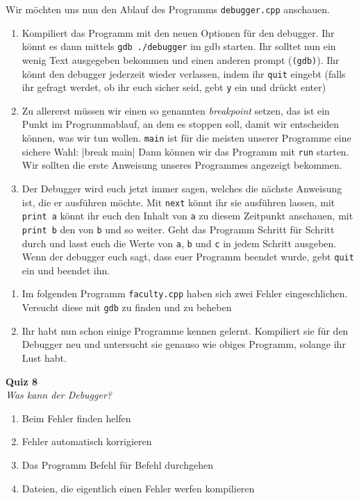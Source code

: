 \newpage

\begin{praxis}

    Wir möchten uns nun den Ablauf des Programms \texttt{debugger.cpp} anschauen.

    \begin{enumerate}
        \item Kompiliert das Programm mit den neuen Optionen für den debugger. Ihr
              könnt es dann mittels \verb|gdb ./debugger| im gdb starten. Ihr solltet
              nun ein wenig Text ausgegeben bekommen und einen anderen prompt
              (\texttt{(gdb)}). Ihr könnt den debugger jederzeit wieder verlassen,
              indem ihr \texttt{quit} eingebt (falls ihr gefragt werdet, ob ihr euch
              sicher seid, gebt \texttt{y} ein und drückt enter)
        \item Zu allererst müssen wir einen so genannten \emph{breakpoint} setzen,
              das ist ein Punkt im Programmablauf, an dem es stoppen soll, damit wir
              entscheiden können, was wir tun wollen. \texttt{main} ist für die
              meisten unserer Programme eine sichere Wahl:
              |break main|
              Dann können wir das Programm mit \texttt{run} starten. Wir sollten die
              erste Anweisung unseres Programmes angezeigt bekommen.
        \item Der Debugger wird euch jetzt immer sagen, welches die nächste
              Anweisung ist, die er ausführen möchte. Mit \texttt{next} könnt ihr sie
              ausführen lassen, mit \texttt{print a} könnt ihr euch den Inhalt von
              \texttt{a} zu diesem Zeitpunkt anschauen, mit \texttt{print b} den von
              \texttt{b} und so weiter. Geht das Programm Schritt für Schritt durch
              und lasst euch die Werte von \texttt{a}, \texttt{b} und \texttt{c} in
              jedem Schritt ausgeben. Wenn der debugger euch sagt, dass euer Programm
              beendet wurde, gebt \texttt{quit} ein und beendet ihn.
    \end{enumerate}
\end{praxis}

\begin{spiel}
\begin{enumerate}
        \item Im folgenden Programm \texttt{faculty.cpp} haben sich zwei Fehler eingeschlichen. Versucht diese mit \texttt{gdb} zu finden und zu beheben
        
        
        \item Ihr habt nun schon einige Programme kennen gelernt. Kompiliert sie
              für den Debugger neu und untersucht sie genauso wie obiges Programm,
              solange ihr Lust habt.
\end{enumerate}
\end{spiel}

\textbf{Quiz 8}\\
\textit{Was kann der Debugger?}
\begin{enumerate}[label=\alph]
    \item Beim Fehler finden helfen
    \item Fehler automatisch korrigieren
    \item Das Programm Befehl für Befehl durchgehen
    \item Dateien, die eigentlich einen Fehler werfen kompilieren
\end{enumerate}